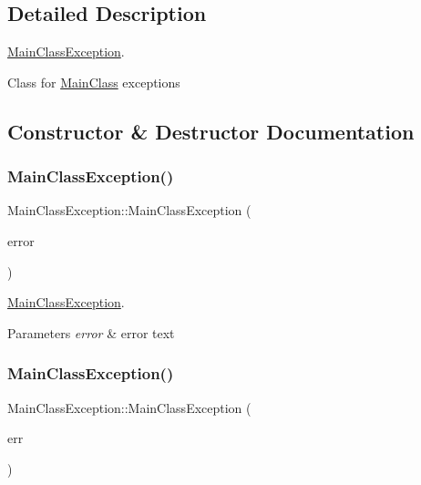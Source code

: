 \subsection{Detailed Description}
\hyperlink{class_main_class_exception}{Main\+Class\+Exception}. 

Class for \hyperlink{class_main_class}{Main\+Class} exceptions 

\subsection{Constructor \& Destructor Documentation}
\mbox{\label{class_main_class_exception_a39be0f0d65c75e63760143fa8559b4b9}} 
\subsubsection{\texorpdfstring{Main\+Class\+Exception()}{MainClassException()}\hspace{0.1cm}{\footnotesize\ttfamily [1/2]}}
{\footnotesize\ttfamily Main\+Class\+Exception\+::\+Main\+Class\+Exception (\begin{DoxyParamCaption}\item[{const char $\ast$}]{error }\end{DoxyParamCaption})}



\hyperlink{class_main_class_exception}{Main\+Class\+Exception}. 


\begin{DoxyParams}{Parameters}
{\em error} & error text \\
\hline
\end{DoxyParams}
\mbox{\label{class_main_class_exception_a355074a9b4a2dbef92330926da0e67ca}} 
\subsubsection{\texorpdfstring{Main\+Class\+Exception()}{MainClassException()}\hspace{0.1cm}{\footnotesize\ttfamily [2/2]}}
{\footnotesize\ttfamily Main\+Class\+Exception\+::\+Main\+Class\+Exception (\begin{DoxyParamCaption}\item[{Error\+Type\+Main\+Class}]{err }\end{DoxyParamCaption})}



